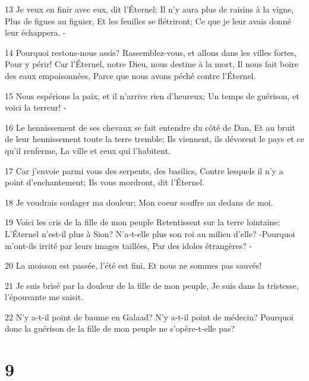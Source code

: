 \par 13 Je veux en finir avec eux, dit l'Éternel; Il n'y aura plus de raisins à la vigne, Plus de figues au figuier, Et les feuilles se flétriront; Ce que je leur avais donné leur échappera. -
\par 14 Pourquoi restons-nous assis? Rassemblez-vous, et allons dans les villes fortes, Pour y périr! Car l'Éternel, notre Dieu, nous destine à la mort, Il nous fait boire des eaux empoisonnées, Parce que nous avons péché contre l'Éternel.
\par 15 Nous espérions la paix, et il n'arrive rien d'heureux; Un temps de guérison, et voici la terreur! -
\par 16 Le hennissement de ses chevaux se fait entendre du côté de Dan, Et au bruit de leur hennissement toute la terre tremble; Ils viennent, ils dévorent le pays et ce qu'il renferme, La ville et ceux qui l'habitent.
\par 17 Car j'envoie parmi vous des serpents, des basilics, Contre lesquels il n'y a point d'enchantement; Ils vous mordront, dit l'Éternel.
\par 18 Je voudrais soulager ma douleur; Mon coeur souffre au dedans de moi.
\par 19 Voici les cris de la fille de mon peuple Retentissent sur la terre lointaine: L'Éternel n'est-il plus à Sion? N'a-t-elle plus son roi au milieu d'elle? -Pourquoi m'ont-ils irrité par leurs images taillées, Par des idoles étrangères? -
\par 20 La moisson est passée, l'été est fini, Et nous ne sommes pas sauvés!
\par 21 Je suis brisé par la douleur de la fille de mon peuple, Je suis dans la tristesse, l'épouvante me saisit.
\par 22 N'y a-t-il point de baume en Galaad? N'y a-t-il point de médecin? Pourquoi donc la guérison de la fille de mon peuple ne s'opère-t-elle pas?

\chapter{9}

